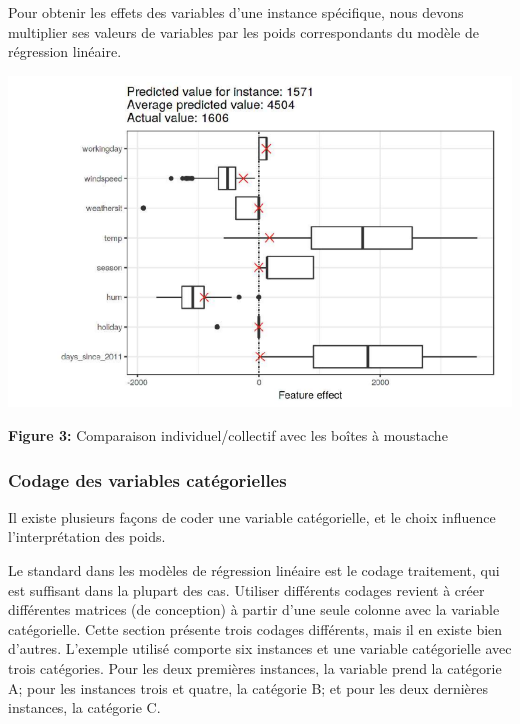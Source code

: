Pour obtenir les effets des variables d'une instance spécifique, nous devons multiplier ses valeurs de variables par les poids correspondants du modèle de régression linéaire.

\hspace{1.5cm}
\includegraphics[width=0.7\linewidth]{Images/effect_collectif.png}
\begin{center}
    \textbf{Figure 3:} Comparaison individuel/collectif avec les boîtes à moustache 
\end{center}

\subsubsection{Codage des variables catégorielles}
Il existe plusieurs façons de coder une variable catégorielle, et le choix influence l'interprétation des poids.

Le standard dans les modèles de régression linéaire est le codage traitement, qui est suffisant dans la plupart des cas. Utiliser différents codages revient à créer différentes matrices (de conception) à partir d'une seule colonne avec la variable catégorielle. Cette section présente trois codages différents, mais il en existe bien d'autres. L'exemple utilisé comporte six instances et une variable catégorielle avec trois catégories. Pour les deux premières instances, la variable prend la catégorie A; pour les instances trois et quatre, la catégorie B; et pour les deux dernières instances, la catégorie C.

